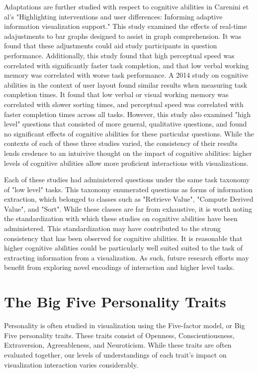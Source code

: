 \documentclass[conference]{IEEEtran}
\begin{document}
Adaptations are further studied with respect to cognitive abilities in
Carenini et al's "Highlighting interventions and user differences:
Informing adaptive information visualization support." This study
examined the effects of real-time adajustments to bar graphs designed to
assist in graph comprehension. It was found that these adjustments could
aid study participants in question performance. Additionally, this study
found that high perceptual speed was correlated with significantly faster
task completion, and that low verbal working memory was correlated with
worse task performance\cite{HighlightingInterventions}. A 2014 study on
cognitive abilities in the context of user layout found similar
results when measuring task completion times. It found that low verbal or visual
working memory was correlated with slower sorting times, and perceptual speed
was correlated with faster completion times across all tasks\cite{ConatiLayouts}.
However, this study also examined "high level" questions that consisted of more
general, qualitative questions, and found no significant effects of cognitive
abilities for these particular questions.
While the contexts of each of these three studies varied, the consistency of their
results lends credence to an intuivive thought on the impact of cognitive abilities:
higher levels of cognitive abilities allow more proficient interactions with visualizations.

Each of these studies had administered questions under the same task taxonomy of
"low level" tasks. This taxonomy enumerated questions as forms of information
extraction, which belonged to classes such as "Retrieve Value", "Compute Derived
Value", and "Sort"\cite{Amar}. While these classes are far from exhaustive, it is
worth noting the standardization with which these studies on cognitive abilities
have been administered. This standardization may have contributed to the strong 
consistency that has been observed for cognitive abilities. It is reasonable that
higher cognitive abilities could be particularly well suited suited to the task
of extracting information from a visualization. As such, future research efforts
may benefit from exploring novel encodings of interaction and higher level tasks.

\section{The Big Five Personality Traits}
Personality is often studied in visualization using the Five-factor model, or
Big Five personality traits. These traits consist of Openness, Conscientiousness,
Extraversion, Agreeableness, and Neuroticism. While these traits are often
evaluated together, our levels of understandings of each trait's impact on visualization
interaction varies considerably.
\end{document}
